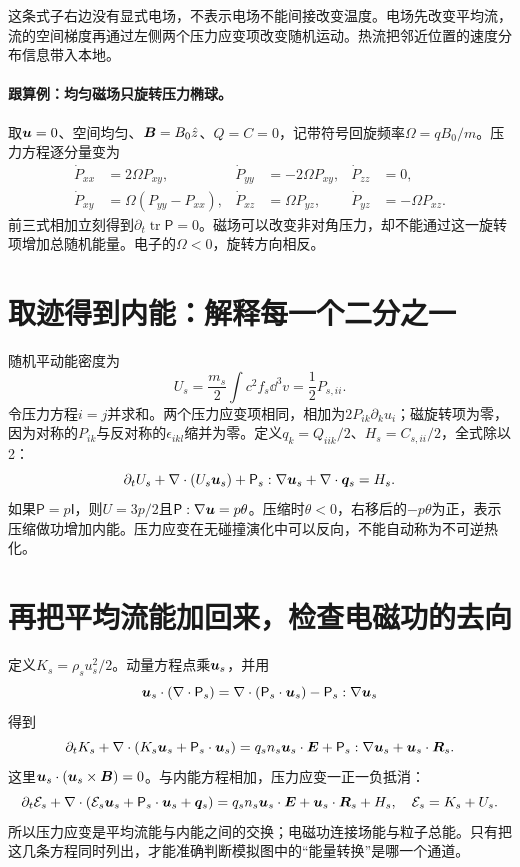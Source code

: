 这条式子右边没有显式电场，不表示电场不能间接改变温度。电场先改变平均流，流的空间梯度再通过左侧两个压力应变项改变随机运动。热流把邻近位置的速度分布信息带入本地。

\paragraph{跟算例：均匀磁场只旋转压力椭球。}
取$\bm{u}=0$、空间均匀、$\bm{B}=B_0\hat z$、$Q=C=0$，记带符号回旋频率$\Omega=qB_0/m$。压力方程逐分量变为
\begin{align}
 \dot P_{xx}&=2\Omega P_{xy},&
 \dot P_{yy}&=-2\Omega P_{xy},&
 \dot P_{zz}&=0,\\
 \dot P_{xy}&=\Omega(P_{yy}-P_{xx}),&
 \dot P_{xz}&=\Omega P_{yz},&
 \dot P_{yz}&=-\Omega P_{xz}.
\end{align}
前三式相加立刻得到$\partial_t\operatorname{tr}\mathsf P=0$。磁场可以改变非对角压力，却不能通过这一旋转项增加总随机能量。电子的$\Omega<0$，旋转方向相反。

\section{取迹得到内能：解释每一个二分之一}
随机平动能密度为
\begin{equation}
 U_s=\frac{m_s}2\int c^2f_s\dd^3v=\frac12P_{s,ii}.
\end{equation}
令压力方程$i=j$并求和。两个压力应变项相同，相加为$2P_{ik}\partial_ku_i$；磁旋转项为零，因为对称的$P_{ik}$与反对称的$\epsilon_{ikl}$缩并为零。定义$q_k=Q_{iik}/2$、$H_s=C_{s,ii}/2$，全式除以2：
\begin{equation}
 \partial_tU_s+\nabla\cdot(U_s\bm{u}_s)
 +\mathsf P_s:\nabla\bm{u}_s+\nabla\cdot\bm{q}_s=H_s.
 \label{hall:eq:internal}
\end{equation}
如果$\mathsf P=p\mathsf I$，则$U=3p/2$且$\mathsf P:\nabla\bm{u}=p\theta$。压缩时$\theta<0$，右移后的$-p\theta$为正，表示压缩做功增加内能。压力应变在无碰撞演化中可以反向，不能自动称为不可逆热化。

\section{再把平均流能加回来，检查电磁功的去向}
定义$K_s=\rho_su_s^2/2$。动量方程点乘$\bm{u}_s$，并用
\begin{equation}
 \bm{u}_s\cdot(\nabla\cdot\mathsf P_s)
 =\nabla\cdot(\mathsf P_s\cdot\bm{u}_s)-\mathsf P_s:\nabla\bm{u}_s
\end{equation}
得到
\begin{equation}
 \partial_tK_s+\nabla\cdot(K_s\bm{u}_s+\mathsf P_s\cdot\bm{u}_s)
 =q_sn_s\bm{u}_s\cdot\bm{E}+\mathsf P_s:\nabla\bm{u}_s+\bm{u}_s\cdot\bm{R}_s.
\end{equation}
这里$\bm{u}_s\cdot(\bm{u}_s\times\bm{B})=0$。与内能方程相加，压力应变一正一负抵消：
\begin{equation}
 \partial_t\mathcal E_s+
 \nabla\cdot(\mathcal E_s\bm{u}_s+\mathsf P_s\cdot\bm{u}_s+\bm{q}_s)
 =q_sn_s\bm{u}_s\cdot\bm{E}+\bm{u}_s\cdot\bm{R}_s+H_s,
 \quad\mathcal E_s=K_s+U_s.
 \label{hall:eq:energy}
\end{equation}
所以压力应变是平均流能与内能之间的交换；电磁功连接场能与粒子总能。只有把这几条方程同时列出，才能准确判断模拟图中的“能量转换”是哪一个通道。

